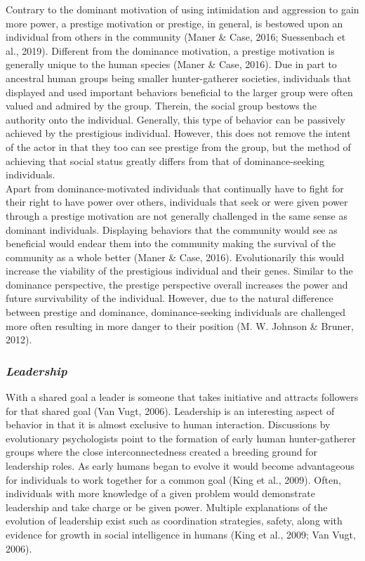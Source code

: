 \documentclass[
  donotrepeattitle,doc, 12pt, a4paper,floatsintext]{apa7}
\begin{document}
Contrary to the dominant motivation of using intimidation and aggression to gain more power, a prestige motivation or prestige, in general, is bestowed upon an individual from others in the community (Maner \& Case, 2016; Suessenbach et al., 2019). Different from the dominance motivation, a prestige motivation is generally unique to the human species (Maner \& Case, 2016). Due in part to ancestral human groups being smaller hunter-gatherer societies, individuals that displayed and used important behaviors beneficial to the larger group were often valued and admired by the group. Therein, the social group bestows the authority onto the individual. Generally, this type of behavior can be passively achieved by the prestigious individual. However, this does not remove the intent of the actor in that they too can see prestige from the group, but the method of achieving that social status greatly differs from that of dominance-seeking individuals.\\

Apart from dominance-motivated individuals that continually have to fight for their right to have power over others, individuals that seek or were given power through a prestige motivation are not generally challenged in the same sense as dominant individuals. Displaying behaviors that the community would see as beneficial would endear them into the community making the survival of the community as a whole better (Maner \& Case, 2016). Evolutionarily this would increase the viability of the prestigious individual and their genes. Similar to the dominance perspective, the prestige perspective overall increases the power and future survivability of the individual. However, due to the natural difference between prestige and dominance, dominance-seeking individuals are challenged more often resulting in more danger to their position (M. W. Johnson \& Bruner, 2012).

\hypertarget{leadership}{%
\subsubsection{\texorpdfstring{\emph{Leadership}}{Leadership}}\label{leadership}}

With a shared goal a leader is someone that takes initiative and attracts followers for that shared goal (Van Vugt, 2006). Leadership is an interesting aspect of behavior in that it is almost exclusive to human interaction. Discussions by evolutionary psychologists point to the formation of early human hunter-gatherer groups where the close interconnectedness created a breeding ground for leadership roles. As early humans began to evolve it would become advantageous for individuals to work together for a common goal (King et al., 2009). Often, individuals with more knowledge of a given problem would demonstrate leadership and take charge or be given power. Multiple explanations of the evolution of leadership exist such as coordination strategies, safety, along with evidence for growth in social intelligence in humans (King et al., 2009; Van Vugt, 2006).\\
\end{document}
